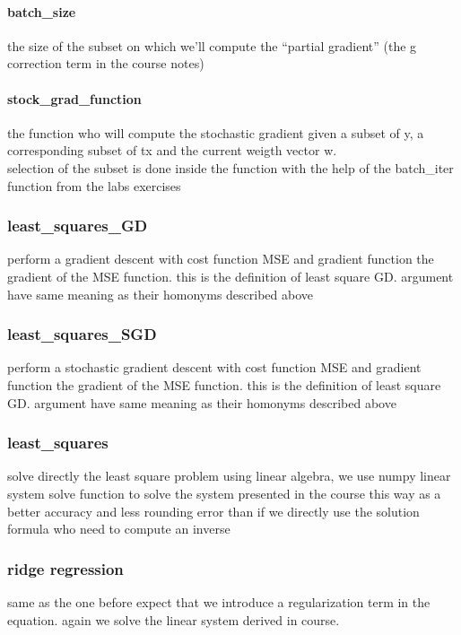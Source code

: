 \documentclass[10pt,conference,compsocconf]{IEEEtran}
\begin{document}
\paragraph{batch\_size} the size of the subset on which we'll compute the
``partial gradient'' (the g correction term in the course notes)
\paragraph{stock\_grad\_function} the function who will compute the stochastic
gradient given a subset of y, a corresponding subset of tx and the
current weigth vector w.
\\selection of the subset is done inside the function with
the help of the batch\_iter function from the labs exercises


\subsubsection{least\_squares\_GD}
perform a gradient descent with cost function MSE and gradient function the gradient of the MSE function. this is the definition of least square GD. argument have same meaning as their homonyms described above

\subsubsection{least\_squares\_SGD}
perform a stochastic gradient descent with cost function MSE and gradient function the gradient of the MSE function. this is the definition of least square GD. argument have same meaning as their homonyms described above

\subsubsection{least\_squares}
solve directly the least square problem using linear algebra, we use numpy linear system solve function to solve the system presented in the course this way as a better accuracy and less rounding error than if we directly use the solution formula who need to compute an inverse

\subsubsection{ridge regression}

same as the one before expect that we introduce a regularization term in the equation. again we solve the linear system derived in course.
\end{document}
